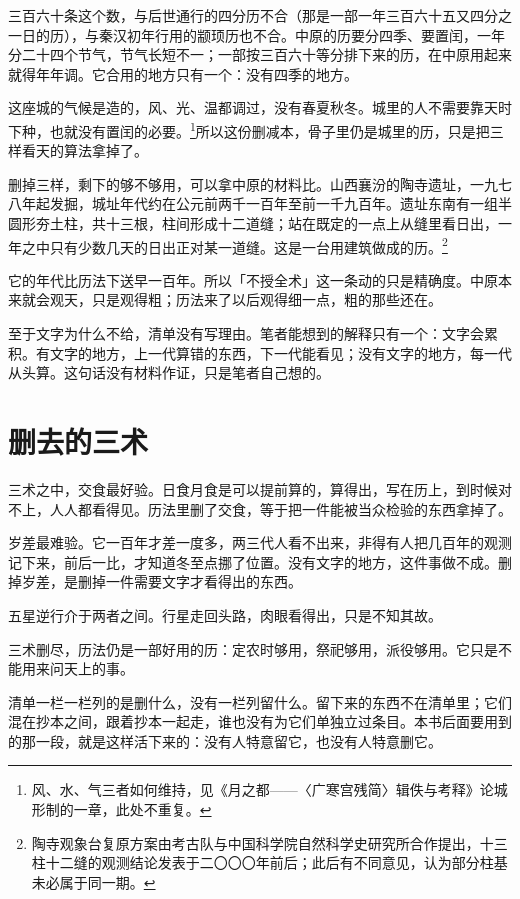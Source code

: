 三百六十条这个数，与后世通行的四分历不合（那是一部一年三百六十五又四分之一日的历），与秦汉初年行用的颛顼历也不合。中原的历要分四季、要置闰，一年分二十四个节气，节气长短不一；一部按三百六十等分排下来的历，在中原用起来就得年年调。它合用的地方只有一个：没有四季的地方。

这座城的气候是造的，风、光、温都调过，没有春夏秋冬。城里的人不需要靠天时下种，也就没有置闰的必要。\footnote{风、水、气三者如何维持，见《月之都——〈广寒宫残简〉辑佚与考释》论城形制的一章，此处不重复。}所以这份删减本，骨子里仍是城里的历，只是把三样看天的算法拿掉了。

删掉三样，剩下的够不够用，可以拿中原的材料比。山西襄汾的陶寺遗址，一九七八年起发掘，城址年代约在公元前两千一百年至前一千九百年。遗址东南有一组半圆形夯土柱，共十三根，柱间形成十二道缝；站在既定的一点上从缝里看日出，一年之中只有少数几天的日出正对某一道缝。这是一台用建筑做成的历。\footnote{陶寺观象台复原方案由考古队与中国科学院自然科学史研究所合作提出，十三柱十二缝的观测结论发表于二〇〇〇年前后；此后有不同意见，认为部分柱基未必属于同一期。}

它的年代比历法下送早一百年。所以「不授全术」这一条动的只是精确度。中原本来就会观天，只是观得粗；历法来了以后观得细一点，粗的那些还在。

至于文字为什么不给，清单没有写理由。笔者能想到的解释只有一个：文字会累积。有文字的地方，上一代算错的东西，下一代能看见；没有文字的地方，每一代从头算。这句话没有材料作证，只是笔者自己想的。

\section{删去的三术}

三术之中，交食最好验。日食月食是可以提前算的，算得出，写在历上，到时候对不上，人人都看得见。历法里删了交食，等于把一件能被当众检验的东西拿掉了。

岁差最难验。它一百年才差一度多，两三代人看不出来，非得有人把几百年的观测记下来，前后一比，才知道冬至点挪了位置。没有文字的地方，这件事做不成。删掉岁差，是删掉一件需要文字才看得出的东西。

五星逆行介于两者之间。行星走回头路，肉眼看得出，只是不知其故。

三术删尽，历法仍是一部好用的历：定农时够用，祭祀够用，派役够用。它只是不能用来问天上的事。

清单一栏一栏列的是删什么，没有一栏列留什么。留下来的东西不在清单里；它们混在抄本之间，跟着抄本一起走，谁也没有为它们单独立过条目。本书后面要用到的那一段，就是这样活下来的：没有人特意留它，也没有人特意删它。

